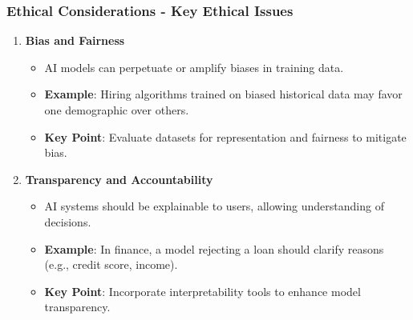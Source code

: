\documentclass[aspectratio=169]{beamer}
\begin{document}
\begin{frame}[fragile]
    \frametitle{Ethical Considerations - Key Ethical Issues}
    \begin{enumerate}
        \item \textbf{Bias and Fairness}
            \begin{itemize}
                \item AI models can perpetuate or amplify biases in training data.
                \item \textbf{Example}: Hiring algorithms trained on biased historical data may favor one demographic over others.
                \item \textbf{Key Point}: Evaluate datasets for representation and fairness to mitigate bias.
            \end{itemize}
        \item \textbf{Transparency and Accountability}
            \begin{itemize}
                \item AI systems should be explainable to users, allowing understanding of decisions.
                \item \textbf{Example}: In finance, a model rejecting a loan should clarify reasons (e.g., credit score, income).
                \item \textbf{Key Point}: Incorporate interpretability tools to enhance model transparency.
            \end{itemize}
    \end{enumerate}
\end{frame}
\end{document}

